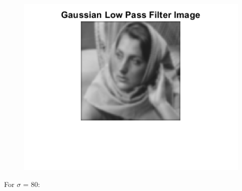 \documentclass{article}
\begin{document}
\begin{figure}[!htb]
\begin{minipage}[b]{0.3\textwidth}
    \end{minipage}
    \begin{minipage}[b]{0.3\textwidth}
        \includegraphics[width=\textwidth]{Gaussian_Filtered_Image.png}
    \end{minipage}
\end{figure}

For $\sigma$ = 80:
\end{document}
